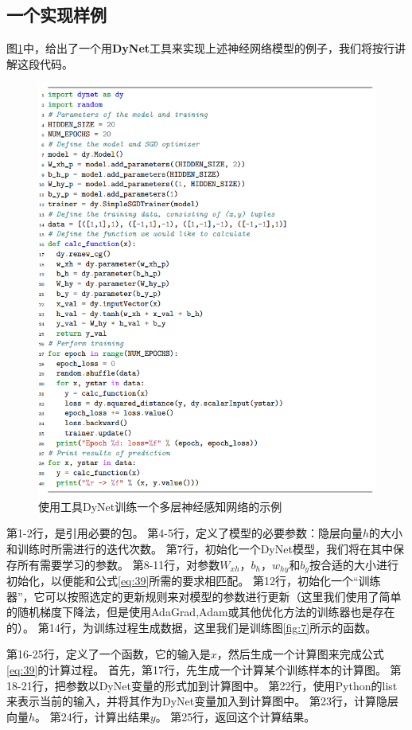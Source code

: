 \documentclass[10pt,a4paper]{ctexart}
\begin{document}
\subsection{一个实现样例}
图\ref{fig:11}中，给出了一个用\textbf{DyNet}工具来实现上述神经网络模型的例子，我们将按行讲解这段代码。
\begin{figure}[H]
\centering
\includegraphics[width=1\textwidth]{fig11.png}
\caption{使用工具DyNet训练一个多层神经感知网络的示例}
\label{fig:11}
\end{figure}
第1-2行，是引用必要的包。
第4-5行，定义了模型的必要参数：隐层向量\textbf{$h$}的大小和训练时所需进行的迭代次数。
第7行，初始化一个DyNet模型，我们将在其中保存所有需要学习的参数。
第8-11行，对参数$W_{xh}$，$b_h$，$w_{hy}$和$b_y$按合适的大小进行初始化，以便能和公式\ref{eq:39}所需的要求相匹配。
第12行，初始化一个“训练器”，它可以按照选定的更新规则来对模型的参数进行更新（这里我们使用了简单的随机梯度下降法，但是使用AdaGrad,Adam或其他优化方法的训练器也是存在的）。
第14行，为训练过程生成数据，这里我们是训练图\ref{fig:7}所示的函数。

第16-25行，定义了一个函数，它的输入是\textbf{$x$}，然后生成一个计算图来完成公式\ref{eq:39}的计算过程。
首先，第17行，先生成一个计算某个训练样本的计算图。
第18-21行，把参数以DyNet变量的形式加到计算图中。
第22行，使用Python的list来表示当前的输入，并将其作为DyNet变量加入到计算图中。
第23行，计算隐层向量\textbf{$h$}。
第24行，计算出结果$y$。
第25行，返回这个计算结果。
\end{document}
